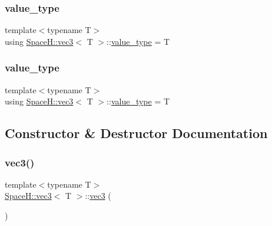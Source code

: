 \mbox{\label{struct_space_h_1_1vec3_a08579f643d09de9cf876530068fe8f7d}} 
\subsubsection{\texorpdfstring{value\+\_\+type}{value\_type}\hspace{0.1cm}{\footnotesize\ttfamily [3/4]}}
{\footnotesize\ttfamily template$<$typename T$>$ \\
using \mbox{\hyperlink{struct_space_h_1_1vec3}{Space\+H\+::vec3}}$<$ T $>$\+::\mbox{\hyperlink{struct_space_h_1_1vec3_a08579f643d09de9cf876530068fe8f7d}{value\+\_\+type}} =  T}

\mbox{\label{struct_space_h_1_1vec3_a08579f643d09de9cf876530068fe8f7d}} 
\subsubsection{\texorpdfstring{value\+\_\+type}{value\_type}\hspace{0.1cm}{\footnotesize\ttfamily [4/4]}}
{\footnotesize\ttfamily template$<$typename T$>$ \\
using \mbox{\hyperlink{struct_space_h_1_1vec3}{Space\+H\+::vec3}}$<$ T $>$\+::\mbox{\hyperlink{struct_space_h_1_1vec3_a08579f643d09de9cf876530068fe8f7d}{value\+\_\+type}} =  T}



\subsection{Constructor \& Destructor Documentation}
\mbox{\label{struct_space_h_1_1vec3_adaeadb1aa964e9f603d2d2402bc0e29a}} 
\subsubsection{\texorpdfstring{vec3()}{vec3()}\hspace{0.1cm}{\footnotesize\ttfamily [1/14]}}
{\footnotesize\ttfamily template$<$typename T$>$ \\
\mbox{\hyperlink{struct_space_h_1_1vec3}{Space\+H\+::vec3}}$<$ T $>$\+::\mbox{\hyperlink{struct_space_h_1_1vec3}{vec3}} (\begin{DoxyParamCaption}{ }\end{DoxyParamCaption})\hspace{0.3cm}{\ttfamily [inline]}}

